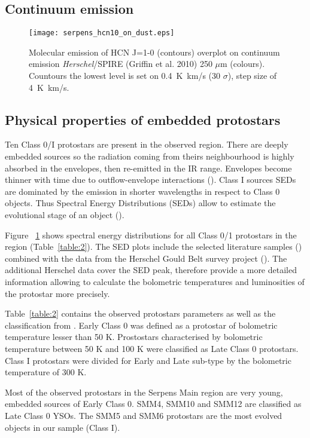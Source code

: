 \documentclass{aa}
\begin{document}
\subsection{Continuum emission}
\begin{figure}
   \texttt{[image: serpens\_hcn10\_on\_dust.eps]}
      \caption{Molecular emission of HCN J=1-0 (contours) overplot on continuum emission \textit{Herschel}/SPIRE (Griffin et al. 2010) 250 $\mu$m (colours). Countours the lowest level is set on 0.4~K~km/s (30 $\sigma$), step size of 4~K~km/s.}
         \label{seds}
   \end{figure}


\subsection{Physical properties of embedded protostars}

Ten Class 0/I protostars are present in the observed region. There are deeply embedded sources so the radiation coming from theirs neighbourhood is highly absorbed in the envelopes, then re-emitted in the IR range. Envelopes become thinner with time due to outflow-envelope interactions (\cite{Arc06}). Class I sources SEDs are dominated by the emission in shorter wavelengths in respect to Class 0 objects. Thus Spectral Energy Distributions (SEDs) allow to estimate the evolutional stage of an object (\cite{And93}). 

Figure ~\ref{seds} shows spectral energy distributions for all Class 0/1 protostars in the region (Table~\ref{table:2}). The SED plots include the selected literature samples (\cite{Dun15}) combined with the data from the Herschel Gould Belt survey project (\cite{And10}). The additional Herschel data cover the SED peak, therefore provide a more detailed information allowing to calculate the bolometric temperatures and luminosities of the protostar more precisely.

Table~\ref{table:2} contains the observed protostars parameters as well as the classification from \cite{Eno09}. Early Class 0 was defined as a protostar of bolometric temperature lesser than 50 K. Prostostars characterised by bolometric temperature between 50 K and 100 K were classified as Late Class 0 protostars. Class I protostars were divided for Early and Late sub-type by the bolometric temperature of 300 K.

Most of the observed protostars in the Serpens Main region are very young, embedded sources of Early Class 0. SMM4, SMM10 and SMM12 are classified as Late Class 0 YSOs. The SMM5 and SMM6 protostars are the most evolved objects in our sample (Class I). 
\end{document}
